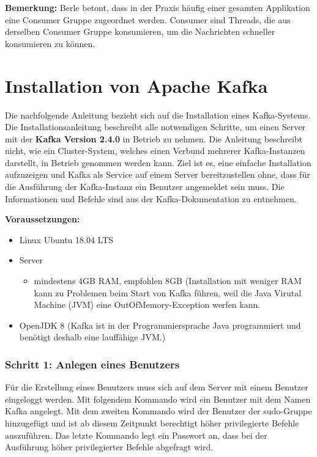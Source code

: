 \documentclass[a4paper,titlepage,halfparskip,12pt]{scrreprt}
\begin{document}
\begin{onehalfspacing}
\textbf{Bemerkung:} Berle \cite{berleKafkaOverview} betont, dass in der Praxis häufig einer gesamten Applikation eine Consumer Gruppe zugeordnet werden. Consumer sind Threads, die aus derselben Consumer Gruppe konsumieren, um die Nachrichten schneller konsumieren zu können.

\pagebreak

\section{Installation von Apache Kafka}
\label{sec:InstallationKafka}

Die nachfolgende Anleitung bezieht sich auf die Installation eines Kafka-Systems. Die Installationsanleitung beschreibt alle notwendigen Schritte, um einen Server mit der \textbf{Kafka Version 2.4.0} in Betrieb zu nehmen. Die Anleitung beschreibt nicht, wie ein Cluster-System, welches einen Verbund mehrerer Kafka-Instanzen darstellt, in Betrieb genommen werden kann. Ziel ist es, eine einfache Installation aufzuzeigen und Kafka als Service auf einem Server bereitzustellen ohne, dass für die Ausführung der Kafka-Instanz ein Benutzer angemeldet sein muss. Die Informationen und Befehle sind aus der Kafka-Dokumentation \cite{kafkaDoc} zu entnehmen.

\bigskip

\textbf{Voraussetzungen:}

\smallskip

\begin{itemize}
\item Linux Ubuntu 18.04 LTS
\item Server
\begin{itemize}
\item mindestens 4GB RAM, empfohlen 8GB (Installation mit weniger RAM kann zu Problemen beim Start von Kafka führen, weil die Java Virutal Machine (JVM) eine \glqq OutOfMemory\grqq -Exception werfen kann.
\end{itemize}
\item OpenJDK 8 (Kafka ist in der Programmiersprache Java programmiert und benötigt deshalb eine lauffähige JVM.)
\end{itemize}

\subsubsection*{Schritt 1: Anlegen eines Benutzers}

Für die Erstellung eines Benutzers muss sich auf dem Server mit einem Benutzer eingeloggt werden. Mit folgendem Kommando wird ein Benutzer mit dem Namen Kafka angelegt. Mit dem zweiten Kommando wird der Benutzer der \glqq sudo\grqq -Gruppe hinzugefügt und ist ab diesem Zeitpunkt berechtigt höher privilegierte Befehle auszuführen. Das letzte Kommando legt ein Passwort an, dass bei der Ausführung höher privilegierter Befehle abgefragt wird.


\end{onehalfspacing}
\end{document}
